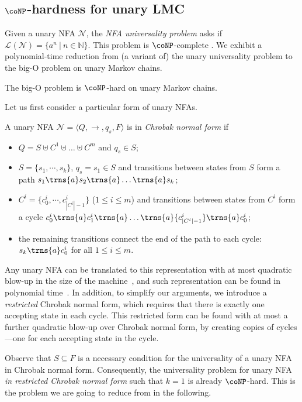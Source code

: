 \documentclass{lmcs}
\theoremstyle{plain}
\theoremstyle{definition}
\theoremstyle{remark}
\newcommand\abra[1]{\langle #1 \rangle}
\newcommand\lng[2]{\mathcal{L}_{#1}(#2)}
\newcommand\nfa{\mathcal{N}}
\begin{document}
\subsection{\texorpdfstring{$\coNP$}{coNP}-hardness for unary LMC}
\label{sec:conphardness}

Given a unary NFA $\nfa$, the \textit{NFA universality problem} asks if $\lng{}{\nfa} = \{a^n\ |\ n\in \mathbb{N}\}$. This problem is $\coNP$-complete \cite{stockmeyer1973word}.
We exhibit a polynomial-time reduction from  (a variant of) the unary universality problem  to the big-O problem on unary Markov chains.

\begin{thm}\label{thm:boundedhard}
The big-O problem is $\coNP$-hard on unary Markov chains.
\end{thm}

Let us first consider a particular form of unary NFAs.
\begin{defi}\label{defn:chro}
A unary NFA $\nfa = \abra{Q, \to, q_s,F}$ is in \textit{Chrobak normal form} \cite{chrobak1986finite} if
\begin{itemize}
  \item $Q = S \uplus C^1 \uplus \dots \uplus C^m$ and $q_s\in S$;
  \item $S=\{ s_1,\cdots,s_k \}$, $q_s=s_1\in S$ and transitions between states from $S$ form a path $s_1 \trns{a} s_2 \trns{a}  \dots \trns{a} s_k$;
  \item $C^i=\{c^i_0,\cdots, c^i_{|C^i|-1}\}$ ($1\le i\le m$) and transitions between states from  $C^i$ form  a cycle $c^i_0 \trns{a} c^i_1 \trns{a}  \dots \trns{a} {c^i_{|C^i|-1}} \trns{a} c^i_0$;
  \item the remaining transitions connect the end of the path to each cycle:  $s_k \trns{a} c^i_0$ for all $1\le i\le m$.
\end{itemize}
\end{defi}
Any unary NFA can be translated to this representation with at most quadratic blow-up in the size of the machine~\cite{chrobak1986finite}, and such representation can be found in polynomial time~\cite{to2009unary,martinez2002efficient}.
In addition, to simplify our arguments, we introduce a \textit{restricted} Chrobak normal form, which requires that there is exactly one accepting state in each cycle.
This restricted form can be found with at most a further quadratic blow-up over Chrobak normal form, by creating copies of cycles---one for each accepting state in the cycle.

Observe that $S\subseteq F$ is a necessary condition for the universality of a unary NFA in Chrobak normal form. Consequently, the universality problem for unary NFA  \textit{in restricted
Chrobak normal form} such that $k=1$  is already $\coNP$-hard. This is the problem we are going to reduce from in the following.
\end{document}
